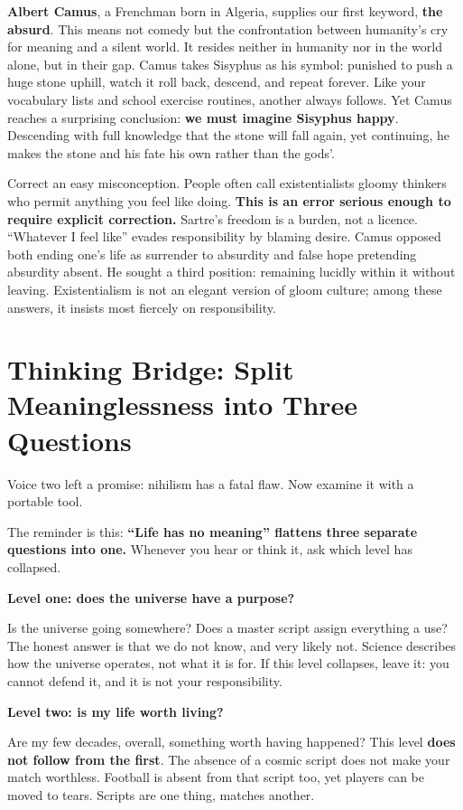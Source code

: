 \textbf{Albert Camus}, a Frenchman born in Algeria, supplies our first keyword, \textbf{the absurd}. This means not comedy but the confrontation between humanity's cry for meaning and a silent world. It resides neither in humanity nor in the world alone, but in their gap. Camus takes Sisyphus as his symbol: punished to push a huge stone uphill, watch it roll back, descend, and repeat forever. Like your vocabulary lists and school exercise routines, another always follows. Yet Camus reaches a surprising conclusion: \textbf{we must imagine Sisyphus happy}. Descending with full knowledge that the stone will fall again, yet continuing, he makes the stone and his fate his own rather than the gods'.

Correct an easy misconception. People often call existentialists gloomy thinkers who permit anything you feel like doing. \textbf{This is an error serious enough to require explicit correction.} Sartre's freedom is a burden, not a licence. ``Whatever I feel like'' evades responsibility by blaming desire. Camus opposed both ending one's life as surrender to absurdity and false hope pretending absurdity absent. He sought a third position: remaining lucidly within it without leaving. Existentialism is not an elegant version of gloom culture; among these answers, it insists most fiercely on responsibility.

\section[Thinking Bridge: Three Questions]{Thinking Bridge: Split Meaninglessness into Three Questions}
Voice two left a promise: nihilism has a fatal flaw. Now examine it with a portable tool.

The reminder is this: \textbf{``Life has no meaning'' flattens three separate questions into one.} Whenever you hear or think it, ask which level has collapsed.

\textbf{Level one: does the universe have a purpose?}

Is the universe going somewhere? Does a master script assign everything a use? The honest answer is that we do not know, and very likely not. Science describes how the universe operates, not what it is for. If this level collapses, leave it: you cannot defend it, and it is not your responsibility.

\textbf{Level two: is my life worth living?}

Are my few decades, overall, something worth having happened? This level \textbf{does not follow from the first}. The absence of a cosmic script does not make your match worthless. Football is absent from that script too, yet players can be moved to tears. Scripts are one thing, matches another.

